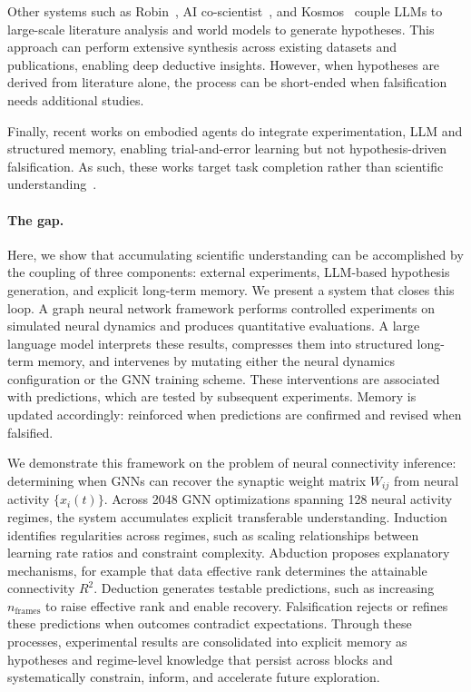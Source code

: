 \documentclass[10pt,twocolumn]{article}
\begin{document}
Other systems such as Robin~\citep{ghareeb_robin_2025}, AI co-scientist~\citep{gottweis_towards_2025}, and Kosmos~\citep{mitchener_kosmos_2025} couple LLMs to large-scale literature analysis and world models to generate hypotheses. This approach can perform extensive synthesis across existing datasets and publications, enabling deep deductive insights. However, when hypotheses are derived from literature alone, the process can be short-ended when falsification needs additional studies.

Finally, recent works on embodied agents do integrate experimentation, LLM and structured memory, enabling trial-and-error learning but not hypothesis-driven falsification. As such, these works target task completion rather than scientific understanding~\citep{majumder_clin_2023, wang_voyager_2023, yang_agentic_2025}.


\paragraph{The gap.}
Here, we show that accumulating scientific understanding can be accomplished by the coupling of three components: external experiments, LLM-based hypothesis generation, and explicit long-term memory. We present a system that closes this loop. A graph neural network framework performs controlled experiments on simulated neural dynamics and produces quantitative evaluations. A large language model interprets these results, compresses them into structured long-term memory, and intervenes by mutating either the neural dynamics configuration or the GNN training scheme. These interventions are associated with predictions, which are tested by subsequent experiments. Memory is updated accordingly: reinforced when predictions are confirmed and revised when falsified.

We demonstrate this framework on the problem of neural connectivity inference: determining when GNNs can recover the synaptic weight matrix $W_{ij}$ from neural activity $\{x_i(t)\}$. Across 2048 GNN optimizations spanning 128 neural activity regimes, the system accumulates explicit transferable understanding. Induction identifies regularities across regimes, such as scaling relationships between learning rate ratios and constraint complexity. Abduction proposes explanatory mechanisms, for example that data effective rank determines the attainable connectivity $R^2$. Deduction generates testable predictions, such as increasing $n_{\mathrm{frames}}$ to raise effective rank and enable recovery. Falsification rejects or refines these predictions when outcomes contradict expectations. Through these processes, experimental results are consolidated into explicit memory as hypotheses and regime-level knowledge that persist across blocks and systematically constrain, inform, and accelerate future exploration.
\end{document}
